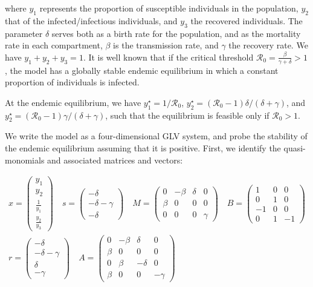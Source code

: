 \documentclass{article}
\begin{document}
where \(y_1\) represents the proportion of susceptible individuals in
the population, \(y_2\) that of the infected/infectious individuals, and
\(y_3\) the recovered individuals. The parameter \(\delta\) serves both
as a birth rate for the population, and as the mortality rate in each
compartment, \(\beta\) is the transmission rate, and \(\gamma\) the
recovery rate. We have \(y_1 + y_2 + y_3 = 1\). It is well known that if
the critical threshold
\(\mathcal R_0 = \frac{\beta}{\gamma + \delta} > 1\), the model has a
globally stable endemic equilibrium in which a constant proportion of
individuals is infected.

At the endemic equilibrium, we have \(y_1^\star = 1 / \mathcal R_0\),
\(y_2^\star = (\mathcal R_0 - 1) \delta / (\delta + \gamma)\), and
\(y_2^\star = (\mathcal R_0 - 1) \gamma / (\delta + \gamma)\), such that
the equilibrium is feasible only if \(\mathcal R_0 >1\).

We write the model as a four-dimensional GLV system, and probe the
stability of the endemic equilibrium assuming that it is positive.
First, we identify the quasi-monomials and associated matrices and
vectors:

\begin{equation}
\begin{aligned}
x = \begin{pmatrix}
y_1\\
y_2\\
\frac{1}{y_1}\\
\frac{y_2}{y_3}
\end{pmatrix}
\quad
s = \begin{pmatrix}
-\delta \\
-\delta - \gamma \\
-\delta
\end{pmatrix}
\quad
M = \begin{pmatrix}
0 & -\beta & \delta & 0\\
\beta & 0 & 0 & 0 \\
0 & 0 & 0 & \gamma
\end{pmatrix}
\quad
B = \begin{pmatrix}
1 & 0 & 0\\
0 & 1 & 0\\
-1 & 0 & 0\\
0 & 1 & -1
\end{pmatrix}
\\
r = \begin{pmatrix}
-\delta \\
-\delta - \gamma \\
\delta\\
-\gamma
\end{pmatrix}
\quad 
A = \begin{pmatrix}
0 & -\beta & \delta & 0 \\
\beta & 0 & 0 & 0\\
0 & \beta & -\delta & 0 \\
\beta & 0 & 0 & -\gamma
\end{pmatrix}
\end{aligned}
\end{equation}
\end{document}
